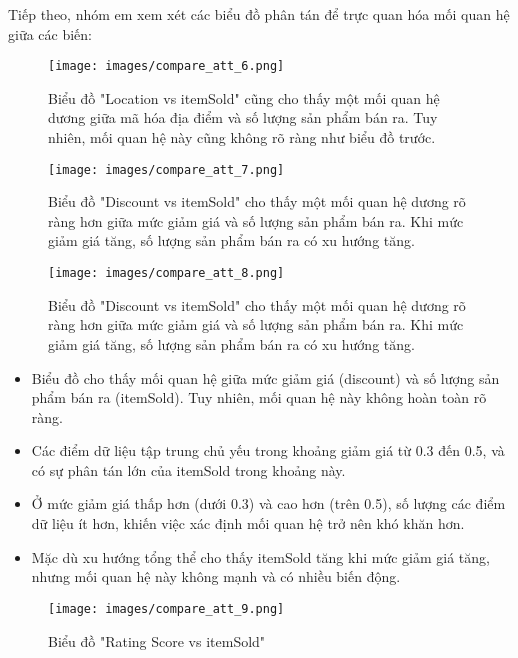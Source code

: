 Tiếp theo, nhóm em xem xét các biểu đồ phân tán để trực quan hóa mối quan hệ giữa các biến:

\begin{figure}[H]
    \centering
    \texttt{[image: images/compare\_att\_6.png]}
    \caption{Biểu đồ "Location vs itemSold" cũng cho thấy một mối quan hệ dương giữa mã hóa địa điểm và số lượng sản phẩm bán ra. Tuy nhiên, mối quan hệ này cũng không rõ ràng như biểu đồ trước.}
    \label{fig:piechart_item_listed}
\end{figure}

\begin{figure}[H]
    \centering
    \texttt{[image: images/compare\_att\_7.png]}
    \caption{Biểu đồ "Discount vs itemSold" cho thấy một mối quan hệ dương rõ ràng hơn giữa mức giảm giá và số lượng sản phẩm bán ra. Khi mức giảm giá tăng, số lượng sản phẩm bán ra có xu hướng tăng.}
    \label{fig:piechart_item_listed}
\end{figure}

\begin{figure}[H]
    \centering
    \texttt{[image: images/compare\_att\_8.png]}
    \caption{Biểu đồ "Discount vs itemSold" cho thấy một mối quan hệ dương rõ ràng hơn giữa mức giảm giá và số lượng sản phẩm bán ra. Khi mức giảm giá tăng, số lượng sản phẩm bán ra có xu hướng tăng.}
    \label{fig:piechart_item_listed}
\end{figure}

\begin{itemize}
    \item Biểu đồ cho thấy mối quan hệ giữa mức giảm giá (discount) và số lượng sản phẩm bán ra (itemSold). Tuy nhiên, mối quan hệ này không hoàn toàn rõ ràng.
    
    \item Các điểm dữ liệu tập trung chủ yếu trong khoảng giảm giá từ 0.3 đến 0.5, và có sự phân tán lớn của itemSold trong khoảng này.

    \item Ở mức giảm giá thấp hơn (dưới 0.3) và cao hơn (trên 0.5), số lượng các điểm dữ liệu ít hơn, khiến việc xác định mối quan hệ trở nên khó khăn hơn.
    
    \item Mặc dù xu hướng tổng thể cho thấy itemSold tăng khi mức giảm giá tăng, nhưng mối quan hệ này không mạnh và có nhiều biến động.
\end{itemize}

\begin{figure}[H]
    \centering
    \texttt{[image: images/compare\_att\_9.png]}
    \caption{Biểu đồ "Rating Score vs itemSold"}
    \label{fig:piechart_item_listed}
\end{figure}

